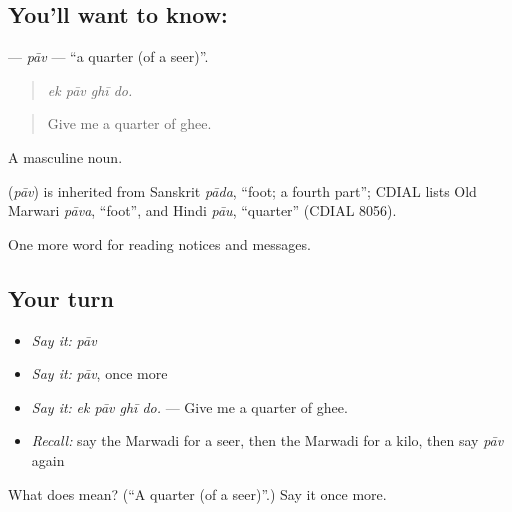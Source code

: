 \subsection*{You'll want to know: }
\textbf{} — \emph{pāv} — \textquotedblleft{}a quarter (of a seer)\textquotedblright{}.

\begin{quote}
   
\end{quote}

\begin{quote}
\emph{ek pāv ghī do.}
\end{quote}

\begin{quote}
Give me a quarter of ghee.
\end{quote}

A masculine noun.

\begin{cousinweb}
\textbf{} (\emph{pāv}) is inherited from Sanskrit \emph{pāda}, \textquotedblleft{}foot; a fourth part\textquotedblright{}; CDIAL lists Old Marwari \emph{pāva}, \textquotedblleft{}foot\textquotedblright{}, and Hindi \emph{pāu}, \textquotedblleft{}quarter\textquotedblright{} (CDIAL 8056).
\end{cousinweb}

\begin{grammarlens}[title={What you've built}]
One more word for reading notices and messages.
\end{grammarlens}

\subsection*{Your turn}
\begin{itemize}
\raggedright
  \item \emph{Say it:} \emph{pāv}
  \item \emph{Say it:} \emph{pāv}, once more
  \item \emph{Say it:} \emph{ek pāv ghī do.} — Give me a quarter of ghee.
  \item \emph{Recall:} say the Marwadi for a seer, then the Marwadi for a kilo, then say \emph{pāv} again
\end{itemize}

\begin{tcolorbox}[breakable,colback=teal!4,colframe=teal!35!black,title={Before you move on}]
What does  mean? (\textquotedblleft{}A quarter (of a seer)\textquotedblright{}.) Say it once more.
\end{tcolorbox}
